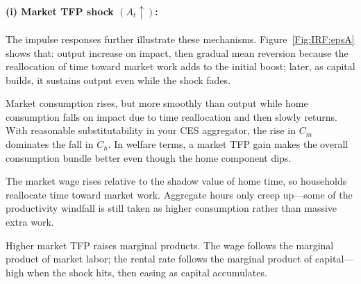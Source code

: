 \documentclass[a4paper,12pt]{article} %
\theoremstyle{nonitalic}
\begin{document}

% 


% 

\paragraph{(i) Market TFP shock $(A_t\uparrow)$:} 

The impulse responses further illustrate these mechanisms.
Figure~\ref{Fig:IRF:epsA} shows that:
output increase on impact, then gradual mean reversion because the reallocation of time toward market work adds to the initial boost;
later, as capital builds, it sustains output even while the shock fades.

Market consumption rises, but more smoothly than output while home consumption falls on impact due to time reallocation and then slowly returns.
With reasonable substitutability in your CES aggregator, the rise in $C_m$ dominates the fall in $C_h$.
In welfare terms, a market TFP gain makes the overall consumption bundle better even though the home component dips.

The market wage rises relative to the shadow value of home time,
so households reallocate time toward market work.
Aggregate hours only creep up—some of the productivity windfall is still taken as higher consumption rather than massive extra work.

Higher market TFP raises marginal products.
The wage follows the marginal product of market labor;
the rental rate follows the marginal product of capital—high when the shock hits,
then easing as capital accumulates.
\end{document}
